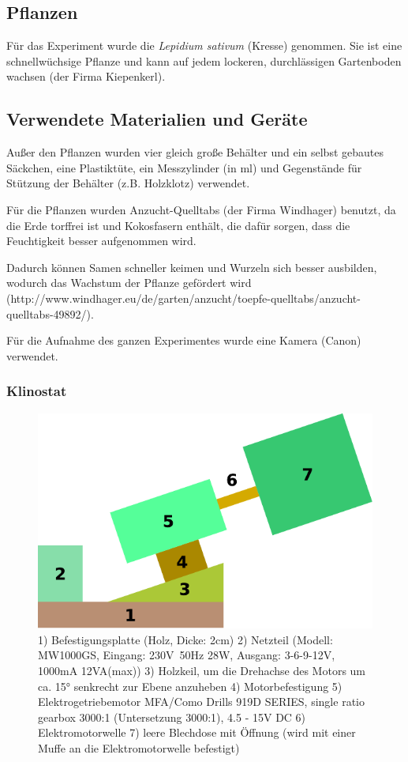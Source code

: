\documentclass[
a4paper, 
11pt, 
ngerman,
listof=totoc,
bibliography=totocnumbered,
abstracton
]{scrreprt}
\begin{document}
\subsection{Pflanzen}

Für das Experiment wurde die \emph{Lepidium sativum} (Kresse) genommen. Sie ist eine schnellwüchsige Pflanze und kann auf jedem lockeren, durchlässigen Gartenboden wachsen (der Firma Kiepenkerl).


\subsection{Verwendete Materialien und Geräte}

Außer den Pflanzen wurden vier gleich große Behälter und ein selbst gebautes Säckchen, eine Plastiktüte, ein Messzylinder (in ml) und Gegenstände für Stützung der Behälter (z.B. Holzklotz) verwendet.

Für die Pflanzen wurden Anzucht-Quelltabs (der Firma Windhager) benutzt, da die Erde torffrei ist und Kokosfasern enthält, die dafür sorgen, dass die Feuchtigkeit besser aufgenommen wird.

Dadurch können Samen schneller keimen und Wurzeln sich besser ausbilden, wodurch das Wachstum der Pflanze gefördert wird (http://www.windhager.eu/de/garten/anzucht/toepfe-quelltabs/anzucht-quelltabs-49892/). 

Für die Aufnahme des ganzen Experimentes wurde eine Kamera (Canon) verwendet.


\subsubsection{Klinostat}

 \begin{figure}[H]
 	\centering 
 	\includegraphics[width = 0.5\linewidth]{images/drawing-1.pdf}
 	\caption{1) Befestigungsplatte (Holz, Dicke: 2cm) 2) Netzteil (Modell: MW1000GS, Eingang: 230V~50Hz 28W, Ausgang: 3-6-9-12V, 1000mA 12VA(max)) 3) Holzkeil, um die Drehachse des Motors um ca. \ang{15} senkrecht zur Ebene anzuheben 4) Motorbefestigung 5) Elektrogetriebemotor MFA/Como Drills 919D SERIES, single ratio gearbox 3000:1 (Untersetzung 3000:1), 4.5 - 15V DC	6) Elektromotorwelle 7) leere Blechdose mit Öffnung (wird mit einer Muffe an die Elektromotorwelle befestigt)}
 \end{figure} 
\end{document}
